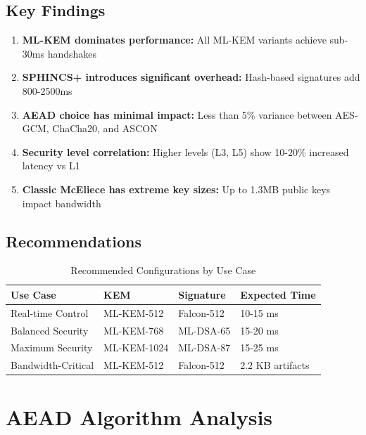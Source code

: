 \documentclass[11pt,a4paper,twoside]{article}
\begin{document}
\subsection{Key Findings}

\begin{enumerate}
    \item \textbf{ML-KEM dominates performance:} All ML-KEM variants achieve sub-30ms handshakes
    \item \textbf{SPHINCS+ introduces significant overhead:} Hash-based signatures add 800-2500ms
    \item \textbf{AEAD choice has minimal impact:} Less than 5\% variance between AES-GCM, ChaCha20, and ASCON
    \item \textbf{Security level correlation:} Higher levels (L3, L5) show 10-20\% increased latency vs L1
    \item \textbf{Classic McEliece has extreme key sizes:} Up to 1.3MB public keys impact bandwidth
\end{enumerate}

\subsection{Recommendations}

\begin{table}[H]
\centering
\caption{Recommended Configurations by Use Case}
\begin{tabular}{l l l l}
\toprule
\textbf{Use Case} & \textbf{KEM} & \textbf{Signature} & \textbf{Expected Time} \\
\midrule
Real-time Control & ML-KEM-512 & Falcon-512 & 10-15 ms \\
Balanced Security & ML-KEM-768 & ML-DSA-65 & 15-20 ms \\
Maximum Security & ML-KEM-1024 & ML-DSA-87 & 15-25 ms \\
Bandwidth-Critical & ML-KEM-512 & Falcon-512 & 2.2 KB artifacts \\
\bottomrule
\end{tabular}
\end{table}

\section{AEAD Algorithm Analysis}
\end{document}
